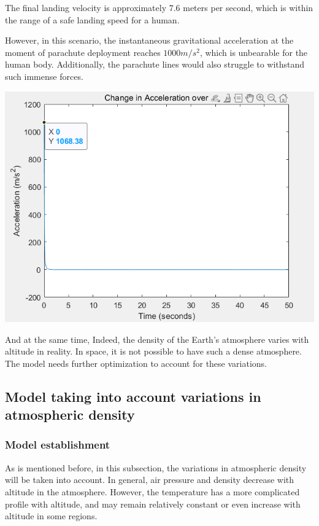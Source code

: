 \documentclass[12pt]{article}
\begin{document}
\begin{minipage}{0.5\linewidth}
    The final landing velocity is approximately 7.6 meters per second, which is within the range of a safe 
    landing speed for a human.

    However, in this scenario, the instantaneous gravitational acceleration 
    at the moment of parachute deployment reaches $1000 m/s^2$, which is unbearable for the human body. 
    Additionally, the parachute lines would also struggle to withstand such immense forces.

\end{minipage}
\hfill
\begin{minipage}{0.4\linewidth}
    \includegraphics[width = \linewidth]{image/005.png}
\end{minipage}
\vspace{6pt}

And at the same time, Indeed, the density of the Earth's atmosphere varies with altitude in reality. 
In space, it is not possible to have such a dense atmosphere. 
The model needs further optimization to account for these variations.

\subsection{Model taking into account variations in atmospheric density}

\subsubsection{Model establishment}
As is mentioned before, in this subsection, the variations in atmospheric density will be taken into account. 
In general, air pressure and density decrease with altitude in the atmosphere. However, the temperature has a more complicated 
profile with altitude, and may remain relatively constant or even increase with altitude in some regions\cite{enwiki:1181726796}.
\end{document}
